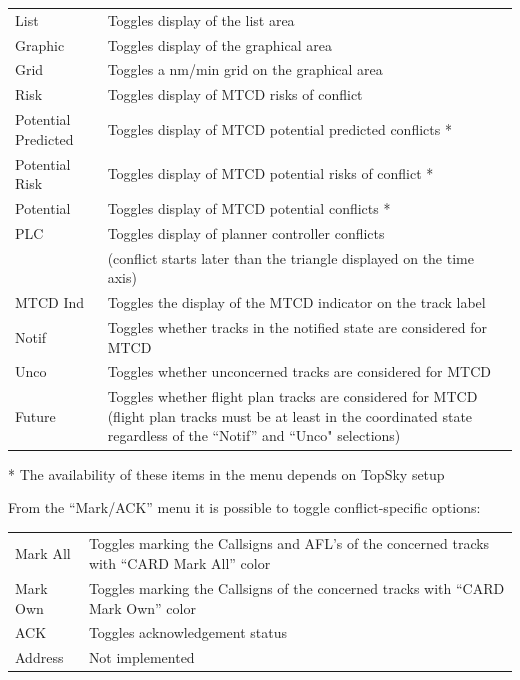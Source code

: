 \documentclass[11pt,a4paper,oldfontcommands]{memoir}
\begin{document}
\begin{tabular}{l l}
    List                & Toggles display of the list area\\
    Graphic             & Toggles display of the graphical area\\
    Grid                & Toggles a nm/min grid on the graphical area\\
    Risk                & Toggles display of MTCD risks of conflict\\
    Potential Predicted & Toggles display of MTCD potential predicted conflicts *\\
    Potential Risk      & Toggles display of MTCD potential risks of conflict *\\
    Potential           & Toggles display of MTCD potential conflicts *\\
    PLC                 & Toggles display of planner controller conflicts\\
                        & (conflict starts later than the triangle displayed on the time axis)\\
    MTCD Ind            & Toggles the display of the MTCD indicator on the track label\\
    Notif               & Toggles whether tracks in the notified state are considered for MTCD\\
    Unco                & Toggles whether unconcerned tracks are considered for MTCD\\
    Future              & Toggles whether flight plan tracks are considered for MTCD (flight plan tracks must be at least in the coordinated state regardless of the “Notif” and “Unco" selections)\\
\end{tabular}

* The availability of these items in the menu depends on TopSky setup

From the “Mark/ACK” menu it is possible to toggle conflict-specific options:

\begin{tabular}{l l}
    Mark All    & Toggles marking the Callsigns and AFL’s of the concerned tracks with “CARD Mark All” color\\
    Mark Own    & Toggles marking the Callsigns of the concerned tracks with “CARD Mark Own” color\\
    ACK         & Toggles acknowledgement status\\
    Address     & Not implemented\\
\end{tabular}
\end{document}
